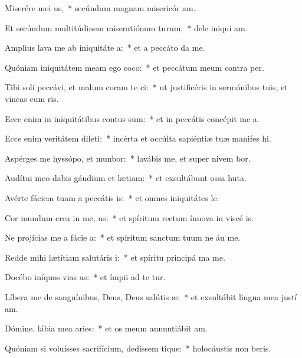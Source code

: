 \item Miserére mei us,~* secúndum magnam misericór am.
\item Et secúndum multitúdinem miseratiónum turum,~* dele iniqui am.
\item Amplius lava me ab iniquitáte a:~* et a peccáto  da me.
\item Quóniam iniquitátem meam ego coco:~* et peccátum meum contra   per.
\item Tibi soli peccávi, et malum coram te ci:~* ut justificéris in sermónibus tuis, et vincas cum ris.
\item Ecce enim in iniquitátibus contus sum:~* et in peccátis concépit me  a.
\item Ecce enim veritátem dileti:~* incérta et occúlta sapiéntiæ tuæ manifes hi.
\item Aspérges me hyssópo, et munbor:~* lavábis me, et super nivem bor.
\item Audítui meo dabis gáudium et lætiam:~* et exsultábunt ossa huta.
\item Avérte fáciem tuam a peccátis is:~* et omnes iniquitátes  le.
\item Cor mundum crea in me, us:~* et spíritum rectum ínnova in viscé is.
\item Ne projícias me a fácie a:~* et spíritum sanctum tuum ne áu  me.
\item Redde mihi lætítiam salutáris i:~* et spíritu principá ma me.
\item Docébo iníquos vias as:~* et ímpii ad te tur.
\item Líbera me de sanguínibus, Deus, Deus salútis æ:~* et exsultábit lingua mea justí am.
\item Dómine, lábia mea aries:~* et os meum annuntiábit  am.
\item Quóniam si voluísses sacrifícium, dedíssem tique:~* holocáustis non beris.

